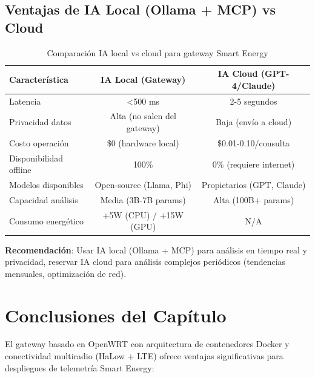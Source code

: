 \subsection{Ventajas de IA Local (Ollama + MCP) vs Cloud}

\begin{table}[h]
\centering
\small
\begin{tabular}{|l|c|c|}
\hline
\textbf{Característica} & \textbf{IA Local (Gateway)} & \textbf{IA Cloud (GPT-4/Claude)} \\
\hline
Latencia & <500 ms & 2-5 segundos \\
Privacidad datos & Alta (no salen del gateway) & Baja (envío a cloud) \\
Costo operación & \$0 (hardware local) & \$0.01-0.10/consulta \\
Disponibilidad offline & 100\% & 0\% (requiere internet) \\
Modelos disponibles & Open-source (Llama, Phi) & Propietarios (GPT, Claude) \\
Capacidad análisis & Media (3B-7B params) & Alta (100B+ params) \\
Consumo energético & +5W (CPU) / +15W (GPU) & N/A \\
\hline
\end{tabular}
\caption{Comparación IA local vs cloud para gateway Smart Energy}
\end{table}

\textbf{Recomendación}: Usar IA local (Ollama + MCP) para análisis en tiempo real y privacidad, reservar IA cloud para análisis complejos periódicos (tendencias mensuales, optimización de red).

\section{Conclusiones del Capítulo}

El gateway basado en OpenWRT con arquitectura de contenedores Docker y conectividad multiradio (HaLow + LTE) ofrece ventajas significativas para despliegues de telemetría Smart Energy:


